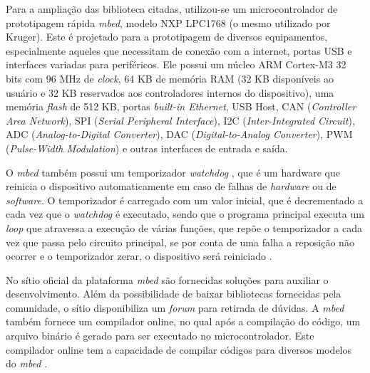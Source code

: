 
Para a ampliação das biblioteca citadas, utilizou-se um microcontrolador de prototipagem rápida \textit{mbed}, modelo NXP LPC1768 \cite{lpc1768:2016} (o mesmo utilizado por Kruger). Este é projetado para a prototipagem de diversos equipamentos, especialmente aqueles que necessitam de conexão com a internet, portas USB e interfaces variadas para periféricos. Ele possui um núcleo ARM Cortex-M3 32 bits com 96 MHz de \textit{clock}, 64 KB de memória RAM (32 KB disponíveis ao usuário e 32 KB reservados aos controladores internos do dispositivo), uma memória \textit{flash} de 512 KB, portas \textit{built-in Ethernet}, USB Host, CAN (\textit{Controller Area Network}), SPI (\textit{Serial Peripheral Interface}), I2C (\textit{Inter-Integrated Circuit}), ADC (\textit{Analog-to-Digital Converter}), DAC (\textit{Digital-to-Analog Converter}), PWM (\textit{Pulse-Width Modulation}) e outras interfaces de entrada e saída.

O \textit{mbed} também possui um temporizador \textit{watchdog} \cite{manualLpc176x:2016}, que é um hardware que reinicia o dispositivo automaticamente em caso de falhas de \textit{hardware} ou de \textit{software}. O temporizador é carregado com um valor inicial, que é decrementado a cada vez que o \textit{watchdog} é executado, sendo que o programa principal executa um \textit{loop} que atravessa a execução de várias funções, que repõe o temporizador a cada vez que passa pelo circuito principal, se por conta de uma falha a reposição não ocorrer e o temporizador zerar, o dispositivo será reiniciado \cite{mbedWhatdog:2016}.

No sítio oficial da plataforma \textit{mbed} são fornecidas soluções para auxiliar o desenvolvimento. Além da possibilidade de baixar bibliotecas fornecidas pela comunidade, o sítio disponibiliza um \textit{forum} para retirada de dúvidas. A \textit{mbed} também fornece um compilador online, no qual após a compilação do código, um arquivo binário é gerado para ser executado no microcontrolador. Este compilador online tem a capacidade de compilar códigos para diversos modelos do \textit{mbed} \cite{mbedCompiler:2016}.

